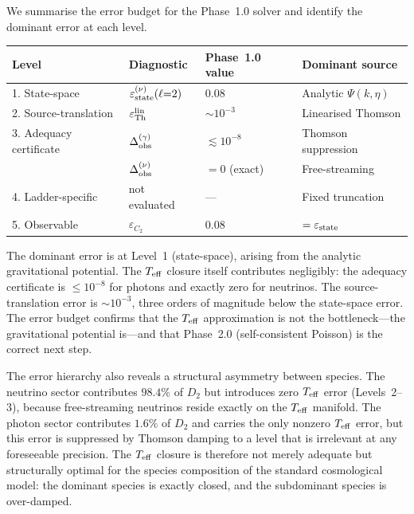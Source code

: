 We summarise the error budget for the Phase~1.0 solver
and identify the dominant error at each level.

\begin{center}
\setlength{\tabcolsep}{5pt}
\begin{tabular}{llll}
\hline\hline
Level & Diagnostic & Phase~1.0 value & Dominant source \\
\hline
1. State-space
  & $\varepsilon_{\rm state}^{(\nu)}(\ell{=}2)$
  & $0.08$
  & Analytic $\Psi(k,\eta)$ \\[3pt]
2. Source-translation
  & $\varepsilon_{\rm Th}^{\rm lin}$
  & $\sim 10^{-3}$
  & Linearised Thomson \\[3pt]
3. Adequacy certificate
  & $\Delta_{\rm obs}^{(\gamma)}$
  & $\lesssim 10^{-8}$
  & Thomson suppression \\[3pt]
  & $\Delta_{\rm obs}^{(\nu)}$
  & $= 0$ (exact)
  & Free-streaming \\[3pt]
4. Ladder-specific
  & not evaluated
  & ---
  & Fixed truncation \\[3pt]
5. Observable
  & $\varepsilon_{C_2}$
  & $0.08$
  & $= \varepsilon_{\rm state}$ \\
\hline\hline
\end{tabular}
\end{center}

The dominant error is at Level~1 (state-space), arising
from the analytic gravitational potential.  The $T_{\mathrm{eff}}$
closure itself contributes negligibly: the adequacy
certificate is $\leq 10^{-8}$ for photons and exactly
zero for neutrinos.  The source-translation error is
$\sim 10^{-3}$, three orders of magnitude below the
state-space error.  The error budget confirms that the
$T_{\mathrm{eff}}$ approximation is not the bottleneck---the
gravitational potential is---and that Phase~2.0
(self-consistent Poisson) is the correct next step.

The error hierarchy also reveals a structural asymmetry
between species.  The neutrino sector contributes
$98.4\%$ of $D_2$ but introduces zero $T_{\mathrm{eff}}$ error
(Levels~2--3), because free-streaming neutrinos reside
exactly on the $T_{\mathrm{eff}}$ manifold.  The photon sector
contributes $1.6\%$ of $D_2$ and carries the only
nonzero $T_{\mathrm{eff}}$ error, but this error is suppressed by
Thomson damping to a level that is irrelevant at any
foreseeable precision.  The $T_{\mathrm{eff}}$ closure is therefore
not merely adequate but structurally optimal for the
species composition of the standard cosmological model:
the dominant species is exactly closed, and the
subdominant species is over-damped.

